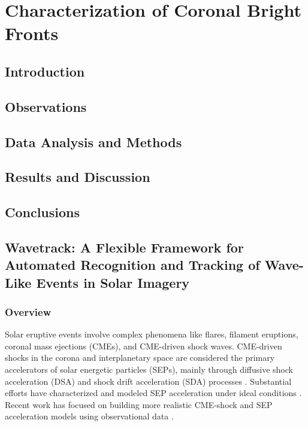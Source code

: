 \chapter{Characterization of Coronal Bright Fronts}
\label{chapter2}

\section{Introduction}

\section{Observations}

\section{Data Analysis and Methods}

\section{Results and Discussion}

\section{Conclusions}






\section{Wavetrack: A Flexible Framework for Automated Recognition and Tracking of Wave-Like Events in Solar Imagery}
\subsection{Overview}
Solar eruptive events involve complex phenomena like flares, filament eruptions, coronal mass ejections (CMEs), and CME-driven shock waves. CME-driven shocks in the corona and interplanetary space are considered the primary accelerators of solar energetic particles (SEPs), mainly through diffusive shock acceleration (DSA) and shock drift acceleration (SDA) processes \citep{reames_2021}. Substantial efforts have characterized and modeled SEP acceleration under ideal conditions \citep{vainio_2008, sokolov_2009, kozarev_2013}. Recent work has focused on building more realistic CME-shock and SEP acceleration models using observational data \citep{vourlidas_2012, kwon_2014, kozarev_2015, kozarev_2019}.

